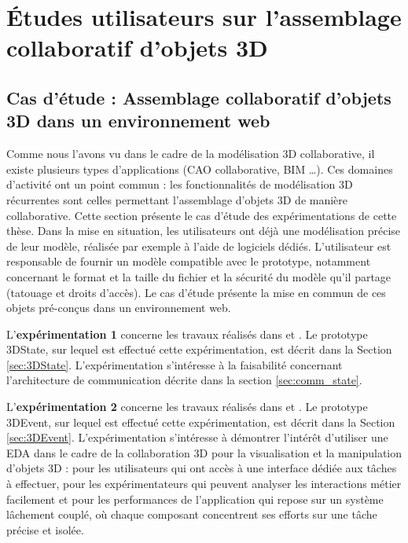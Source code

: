 \chapter{Études utilisateurs sur l'assemblage collaboratif 
d'objets 3D}
\label{sec:chap:expe}
\chaptertable

\section{Cas d'étude : Assemblage collaboratif d'objets 3D dans un 
environnement web}
\label{sec:use_case}
Comme nous l'avons vu dans le cadre de la modélisation \gls{3D} collaborative, il 
existe plusieurs types d'applications (\gls{CAO} collaborative, \gls{BIM} \dots). 
Ces domaines d'activité ont un point commun : les fonctionnalités de 
modélisation \gls{3D} récurrentes sont celles permettant l'assemblage d'objets 
\gls{3D} de manière collaborative. Cette section présente le cas d'étude des 
expérimentations de cette thèse. Dans la mise en situation, les utilisateurs ont 
déjà une modélisation précise de leur modèle,  
réalisée par exemple à l'aide de logiciels dédiés. L'utilisateur est responsable de 
fournir un modèle compatible avec le prototype, notamment concernant le format 
et la taille du fichier et la sécurité du modèle qu'il partage (tatouage et droits 
d'accès). Le cas d'étude présente la mise en commun de ces objets pré-conçus 
dans un environnement web.

L'\textbf{expérimentation 1} concerne les travaux réalisés dans 
\cite{Desprat2015a} 
et \cite{Desprat2015b}. Le prototype 3DState, sur lequel est effectué cette 
expérimentation, est décrit dans la Section \ref{sec:3DState}. L'expérimentation 
s'intéresse à la faisabilité concernant l'architecture 
de communication décrite dans la section \ref{sec:comm_state}. 

 
L'\textbf{expérimentation 2} concerne les travaux réalisés dans 
\cite{Desprat2016} et 
\cite{Desprat2017}. Le prototype 3DEvent, sur lequel est effectué cette 
expérimentation, est décrit dans la Section \ref{sec:3DEvent}. L'expérimentation 
s'intéresse à démontrer l'intérêt d'utiliser une \gls{EDA} dans le cadre de la 
collaboration 3D pour la visualisation et la manipulation d'objets \gls{3D} : pour les 
utilisateurs qui ont accès à une interface dédiée aux tâches à effectuer, pour les 
expérimentateurs qui peuvent analyser les interactions métier facilement et pour 
les performances de l'application qui repose sur un système lâchement couplé, 
où chaque composant concentrent ses efforts sur une tâche précise et isolée. 

